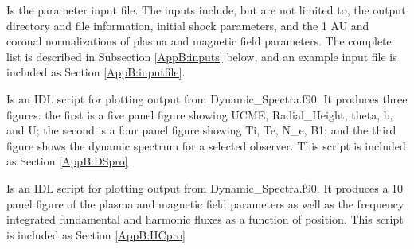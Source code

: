 \documentclass[12pt,a4paper]{article}
\begin{document}
 \parbox[t]{\temptextwidth}{Is the parameter input file. The inputs
                            include,  but are not limited to, the
                            output directory and file  information,
                            initial shock parameters, and the 1 AU 
                            and coronal normalizations of plasma and
                            magnetic field  parameters. The complete
                            list is described in Subsection 
                            \ref{AppB:inputs} below, and an example
                            input file is  included as Section
                            \ref{AppB:inputfile}.}

 \vspace{0.5cm}
 
 \setlength{\temptextwidth}{\textwidth}  
 \addtolength{\temptextwidth}{-1.0\parindent}
 
 \parbox[t]{\temptextwidth}{Is an IDL script for plotting output from 
                            Dynamic\_Spectra.f90. It produces three
                            figures: the first is a five   panel
                            figure showing UCME, Radial\_Height,
                            theta, b, and U;  the second is a four
                            panel figure showing Ti, Te, N\_e, B1;
                            and  the third figure shows the dynamic
                            spectrum for a selected observer. This 
                            script is included as Section \ref{AppB:DSpro}}

 \vspace{0.5cm} 

 \setlength{\temptextwidth}{\textwidth}  
 \addtolength{\temptextwidth}{-1.0\parindent}
 
 \parbox[t]{\temptextwidth}{Is an IDL script for plotting output
                            from  Dynamic\_Spectra.f90. It produces a
                            10 panel figure of the plasma and 
                            magnetic field parameters as well as the
                            frequency integrated  fundamental and
                            harmonic fluxes as a function of
                            position. This  script is included as
                            Section \ref{AppB:HCpro}}
 
\end{document}
